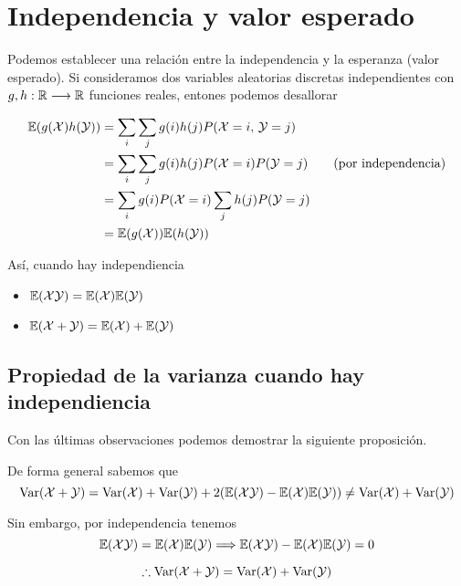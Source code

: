 \chapter{Independencia y valor esperado}
Podemos establecer una relación entre la independencia y la esperanza (valor esperado). Si consideramos dos variables aleatorias discretas independientes con $g,h : \mathbb{R} \longrightarrow \mathbb{R}$ funciones reales, entones podemos desallorar

\begin{align*}
  \mathbb{E}(g(\mathcal{X})h(\mathcal{Y})) &= \sum_i \sum_j g(i)h(j)P(\mathcal{X} = i, \, \mathcal{Y} = j)\\
                       &= \sum_i \sum_j g(i)h(j)P(\mathcal{X} = i)P(\mathcal{Y} = j) \qquad (\text{por independencia}) \\
                       &= \sum_i g(i) P(\mathcal{X} = i) \sum_j h(j) P(\mathcal{Y} = j)\\
                       &= \mathbb{E}(g(\mathcal{X}))\mathbb{E}(h(\mathcal{Y}))
\end{align*}



Así, cuando hay independiencia
\begin{itemize}
  \item $\mathbb{E}(\mathcal{X} \mathcal{Y}) = \mathbb{E}(\mathcal{X}) \mathbb{E}(\mathcal{Y})$
  \item $\mathbb{E}(\mathcal{X} + \mathcal{Y}) = \mathbb{E}(\mathcal{X}) + \mathbb{E}(\mathcal{Y})$
\end{itemize}

\section{Propiedad de la varianza cuando hay independiencia}
Con las últimas observaciones podemos demostrar la siguiente proposición.


\begin{myproof}
  De forma general sabemos que
  \[\operatorname{Var}(\mathcal{X} + \mathcal{Y}) = \operatorname{Var}(\mathcal{X}) + \operatorname{Var}(\mathcal{Y}) + 2(\mathbb{E}(\mathcal{X} \mathcal{Y}) - \mathbb{E}(\mathcal{X})\mathbb{E}(\mathcal{Y})) \neq \operatorname{Var}(\mathcal{X}) + \operatorname{Var}(\mathcal{Y})\]

  Sin embargo, por independencia tenemos
  \[\mathbb{E}(\mathcal{X} \mathcal{Y}) = \mathbb{E}(\mathcal{X})\mathbb{E}(\mathcal{Y}) \Longrightarrow \mathbb{E}(\mathcal{X} \mathcal{Y}) - \mathbb{E}(\mathcal{X})\mathbb{E}(\mathcal{Y}) = 0\]

  \[\therefore \operatorname{Var}(\mathcal{X} + \mathcal{Y}) = \operatorname{Var}(\mathcal{X}) + \operatorname{Var}(\mathcal{Y})\]
\end{myproof}

